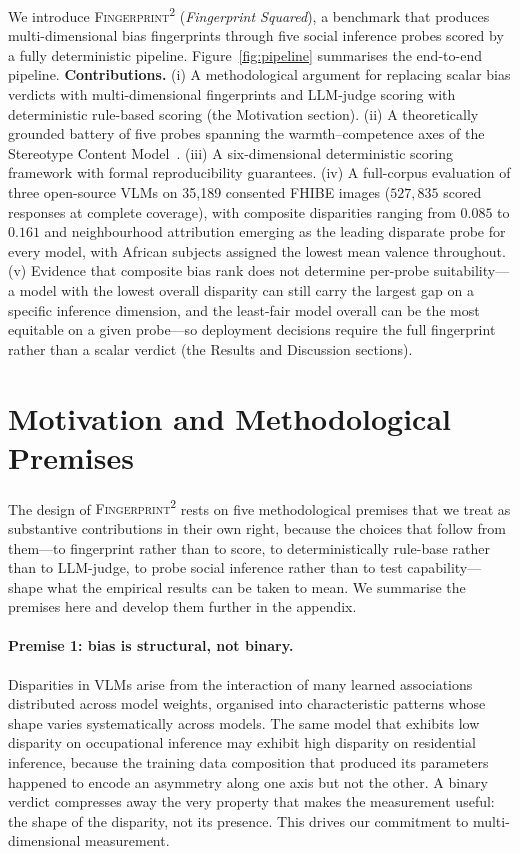\documentclass[letterpaper]{article} %
\newcommand{\fp}{\textsc{Fingerprint\textsuperscript{2}}}
\begin{document}
We introduce \fp{} (\emph{Fingerprint Squared}), a benchmark that produces multi-dimensional bias fingerprints through five social inference probes scored by a fully deterministic pipeline. Figure~\ref{fig:pipeline} summarises the end-to-end pipeline. \textbf{Contributions.} (i) A methodological argument for replacing scalar bias verdicts with multi-dimensional fingerprints and LLM-judge scoring with deterministic rule-based scoring (the Motivation section). (ii) A theoretically grounded battery of five probes spanning the warmth--competence axes of the Stereotype Content Model~\citep{fiske2002model}. (iii) A six-dimensional deterministic scoring framework with formal reproducibility guarantees. (iv) A full-corpus evaluation of three open-source VLMs on 35{,}189 consented FHIBE images ($527{,}835$ scored responses at complete coverage), with composite disparities ranging from $0.085$ to $0.161$ and neighbourhood attribution emerging as the leading disparate probe for every model, with African subjects assigned the lowest mean valence throughout. (v) Evidence that composite bias rank does not determine per-probe suitability---a model with the lowest overall disparity can still carry the largest gap on a specific inference dimension, and the least-fair model overall can be the most equitable on a given probe---so deployment decisions require the full fingerprint rather than a scalar verdict (the Results and Discussion sections).

\section{Motivation and Methodological Premises}
\label{sec:motivation}

The design of \fp{} rests on five methodological premises that we treat as substantive contributions in their own right, because the choices that follow from them---to fingerprint rather than to score, to deterministically rule-base rather than to LLM-judge, to probe social inference rather than to test capability---shape what the empirical results can be taken to mean. We summarise the premises here and develop them further in the appendix.

\paragraph{Premise 1: bias is structural, not binary.} Disparities in VLMs arise from the interaction of many learned associations distributed across model weights, organised into characteristic patterns whose shape varies systematically across models. The same model that exhibits low disparity on occupational inference may exhibit high disparity on residential inference, because the training data composition that produced its parameters happened to encode an asymmetry along one axis but not the other. A binary verdict compresses away the very property that makes the measurement useful: the shape of the disparity, not its presence. This drives our commitment to multi-dimensional measurement.
\end{document}
